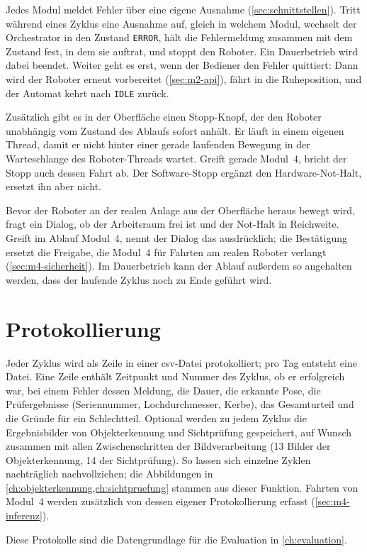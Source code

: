 Jedes Modul meldet Fehler über eine eigene Ausnahme (\cref{sec:schnittstellen}). Tritt
während eines Zyklus eine Ausnahme auf, gleich in welchem Modul, wechselt der Orchestrator in
den Zustand \texttt{ERROR}, hält die Fehlermeldung zusammen mit dem Zustand fest, in dem sie
auftrat, und stoppt den Roboter. Ein Dauerbetrieb wird dabei beendet. Weiter geht es erst,
wenn der Bediener den Fehler quittiert: Dann wird der Roboter erneut vorbereitet
(\cref{sec:m2-api}), fährt in die Ruheposition, und der Automat kehrt nach \texttt{IDLE}
zurück.

Zusätzlich gibt es in der Oberfläche einen Stopp-Knopf, der den Roboter unabhängig vom
Zustand des Ablaufs sofort anhält. Er läuft in einem eigenen Thread, damit er nicht hinter
einer gerade laufenden Bewegung in der Warteschlange des Roboter-Threads wartet. Greift gerade
Modul~4, bricht der Stopp auch dessen Fahrt ab. Der Software-Stopp ergänzt den
Hardware-Not-Halt, ersetzt ihn aber nicht.

Bevor der Roboter an der realen Anlage aus der Oberfläche heraus bewegt wird, fragt ein Dialog,
ob der Arbeitsraum frei ist und der Not-Halt in Reichweite. Greift im Ablauf Modul~4, nennt der
Dialog das ausdrücklich; die Bestätigung ersetzt die Freigabe, die Modul~4 für Fahrten am realen
Roboter verlangt (\cref{sec:m4-sicherheit}). Im Dauerbetrieb kann der Ablauf außerdem so
angehalten werden, dass der laufende Zyklus noch zu Ende geführt wird.

\section{Protokollierung}
\label{sec:int-protokoll}

Jeder Zyklus wird als Zeile in einer \ac{csv}-Datei protokolliert; pro Tag entsteht eine
Datei. Eine Zeile enthält Zeitpunkt und Nummer des Zyklus, ob er erfolgreich war, bei einem
Fehler dessen Meldung, die Dauer, die erkannte Pose, die Prüfergebnisse (Seriennummer,
Lochdurchmesser, Kerbe), das Gesamturteil und die Gründe für ein Schlechtteil. Optional werden
zu jedem Zyklus die Ergebnisbilder von Objekterkennung und Sichtprüfung gespeichert, auf
Wunsch zusammen mit allen Zwischenschritten der Bildverarbeitung (13 Bilder der
Objekterkennung, 14 der Sichtprüfung). So lassen sich einzelne Zyklen nachträglich
nachvollziehen; die Abbildungen in \cref{ch:objekterkennung,ch:sichtpruefung} stammen aus
dieser Funktion. Fahrten von Modul~4 werden zusätzlich von dessen eigener Protokollierung
erfasst (\cref{sec:m4-inferenz}).

Diese Protokolle sind die Datengrundlage für die Evaluation in \cref{ch:evaluation}.

